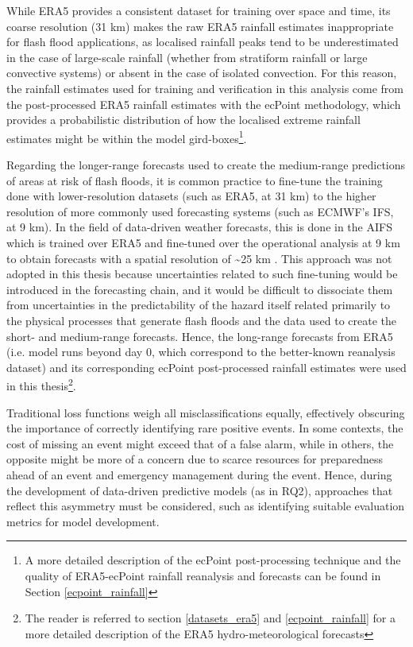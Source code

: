 While ERA5 provides a consistent dataset for training over space and time, its coarse resolution (31 km) makes the raw ERA5 rainfall estimates inappropriate for flash flood applications, as localised rainfall peaks tend to be underestimated in the case of large-scale rainfall (whether from stratiform rainfall or large convective systems) or absent in the case of isolated convection. For this reason, the rainfall estimates used for training and verification in this analysis come from the post-processed ERA5 rainfall estimates with the ecPoint methodology, which provides a probabilistic distribution of how the localised extreme rainfall estimates might be within the model gird-boxes\footnote{A more detailed description of the ecPoint post-processing technique and the quality of ERA5-ecPoint rainfall reanalysis and forecasts can be found in Section \ref{ecpoint_rainfall}}.

Regarding the longer-range forecasts used to create the medium-range predictions of areas at risk of flash floods, it is common practice to fine-tune the training done with lower-resolution datasets (such as ERA5, at 31 km) to the higher resolution of more commonly used forecasting systems (such as ECMWF's IFS, at 9 km). In the field of data-driven weather forecasts, this is done in the AIFS which is trained over ERA5 and fine-tuned over the operational analysis at 9 km to obtain forecasts with a spatial resolution of \sim25 km  \citep{Lang_2024}. This approach was not adopted in this thesis because uncertainties related to such fine-tuning would be introduced in the forecasting chain, and it would be difficult to dissociate them from uncertainties in the predictability of the hazard itself related primarily to the physical processes that generate flash floods and the data used to create the short- and medium-range forecasts. Hence, the long-range forecasts from ERA5 (i.e. model runs beyond day 0, which correspond to the better-known reanalysis dataset) and its corresponding ecPoint post-processed rainfall estimates were used in this thesis\footnote{The reader is referred to section \ref{datasets_era5} and \ref{ecpoint_rainfall} for a more detailed description of the ERA5 hydro-meteorological forecasts}. 

Traditional  loss functions weigh all misclassifications equally, effectively obscuring the importance of correctly identifying rare positive events. In some contexts, the cost of missing an event might exceed that of a false alarm, while in others, the opposite might be more of a concern due to scarce resources for preparedness ahead of an event and emergency management during the event. Hence, during the development of data-driven predictive models (as in RQ2), approaches that reflect this asymmetry must be considered, such as identifying suitable evaluation metrics for model development. 

